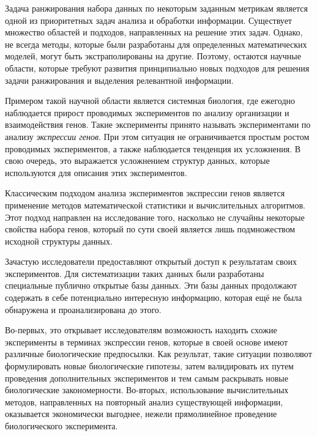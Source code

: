 
{\actuality} Задача ранжирования набора данных по некоторым заданным метрикам является одной из приоритетных задач анализа и обработки информации.
Существует множество областей и подходов, направленных на решение этих задач.
Однако, не всегда методы, которые были разработаны для определенных математических моделей, могут быть экстраполированы на другие.
Поэтому, остаются научные области, которые требуют развития принципиально новых подходов для решения задачи ранжирования и выделения релевантной информации.


Примером такой научной области является системная биология, где ежегодно наблюдается прирост проводимых экспериментов по анализу организации и взаимодействия генов.
Такие эксперименты принято называть экспериментами по анализу \textit{экспрессии генов}.
При этом ситуация не ограничивается простым ростом проводимых экспериментов, а также наблюдается тенденция их усложнения.
В свою очередь, это выражается усложнением структур данных, которые используются для описания этих экспериментов.

Классическим подходом анализа экспериментов экспрессии генов является применение методов математической статистики и вычислительных алгоритмов.
Этот подход направлен на исследование того, насколько не случайны некоторые свойства набора генов, который по сути своей является лишь подмножеством исходной структуры данных.


Зачастую исследователи предоставляют открытый доступ к результатам своих экспериментов.
Для систематизации таких данных были разработаны специальные публично открытые базы данных.
Эти базы данных продолжают содержать в себе потенциально интересную информацию, которая ещё не была обнаружена и проанализирована до этого.

Во-первых, это открывает исследователям возможность находить схожие эксперименты в терминах экспрессии генов, которые в своей основе имеют различные биологические предпосылки.
Как результат, такие ситуации позволяют формулировать новые биологические гипотезы, затем валидировать их путем проведения дополнительных экспериментов и тем самым раскрывать новые биологические закономерности.
Во-вторых, использование вычислительных методов, направленных на повторный анализ существующей информации, оказывается экономически выгоднее, нежели прямолинейное проведение биологического эксперимента.


